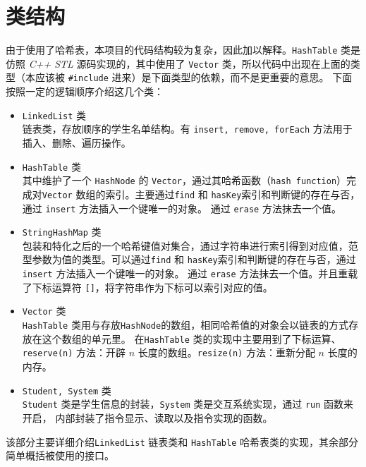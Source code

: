 
\chapter{类结构}
由于使用了哈希表，本项目的代码结构较为复杂，因此加以解释。\lstinline{HashTable} 类是仿照 \emph{C++ STL} 源码实现的，其中使用了%
\lstinline{Vector} 类，所以代码中出现在上面的类型（本应该被 \lstinline{#include} 进来）是下面类型的依赖，而不是更重要的意思。%
下面按照一定的逻辑顺序介绍这几个类：

\begin{itemize}
    \item \lstinline{LinkedList} 类\\
    链表类，存放顺序的学生名单结构。有 \lstinline{insert, remove, forEach} 方法用于插入、删除、遍历操作。
    \item \lstinline{HashTable} 类\\
    其中维护了一个 \lstinline{HashNode} 的 \lstinline{Vector}，通过其哈希函数（\lstinline{hash function}）完成对\lstinline{Vector}%
    数组的索引。主要通过\lstinline{find} 和 \lstinline{hasKey}索引和判断键的存在与否，通过 \lstinline{insert} 方法插入一个键唯一的对象。%
    通过 \lstinline{erase} 方法抹去一个值。
    \item \lstinline{StringHashMap} 类\\
    包装和特化之后的一个哈希键值对集合，通过字符串进行索引得到对应值，范型参数为值的类型。可以通过\lstinline{find} 和 %
    \lstinline{hasKey}索引和判断键的存在与否，通过 \lstinline{insert} 方法插入一个键唯一的对象。%
    通过 \lstinline{erase} 方法抹去一个值。并且重载了下标运算符 \lstinline{[]}，将字符串作为下标可以索引对应的值。
    \item \lstinline{Vector} 类\\
    \lstinline{HashTable} 类用与存放\lstinline{HashNode}的数组，相同哈希值的对象会以链表的方式存放在这个数组的单元里。%
    在\lstinline{HashTable} 类的实现中主要用到了下标运算、\lstinline{reserve(n)} 方法：开辟 $n$ 长度的数组。\lstinline{resize(n)}%
    方法：重新分配 $n$ 长度的内存。
    \item \lstinline{Student, System} 类\\
    \lstinline{Student} 类是学生信息的封装，\lstinline{System} 类是交互系统实现，通过 \lstinline{run} 函数来开启，%
    内部封装了指令显示、读取以及指令实现的函数。
\end{itemize}

该部分主要详细介绍\lstinline{LinkedList} 链表类和 \lstinline{HashTable} 哈希表类的实现，其余部分简单概括被使用的接口。


